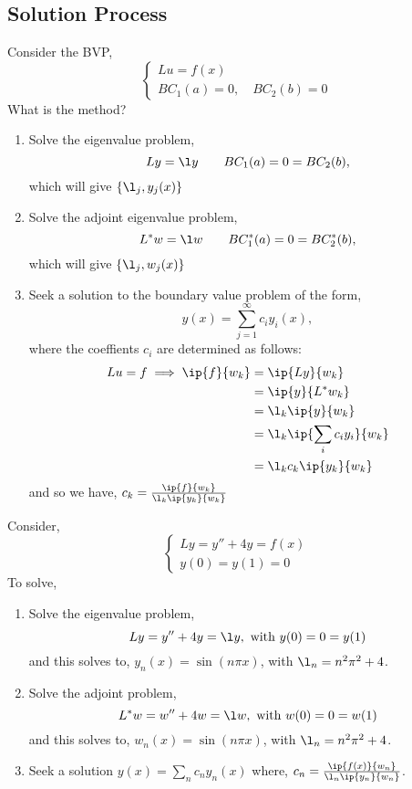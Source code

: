 \subsection{Solution Process}
Consider the BVP,
$$ \begin{cases}
  Lu = f(x) \\
  BC_1(a) = 0, \quad BC_2(b) = 0
\end{cases} $$
What is the method?
\begin{enumerate}
  \item Solve the eigenvalue problem,
  $$ Ly = \l y \qquad BC_1(a) = 0 = BC_2(b), $$
  which will give $\{\l_j, y_j(x)\}$
  \item Solve the adjoint eigenvalue problem,
  $$ L^*w = \l w \qquad BC_1^*(a) = 0 = BC_2^*(b),$$
  which will give $\{\l_j, w_j(x)\}$
  \item Seek a solution to the boundary value problem of the form,
  $$ y(x) = \sum_{j=1}^\infty c_iy_i(x), $$
  where the coeffients $c_i$ are determined as follows:
  \begin{align*}
    Lu = f \implies \ip{f}{w_k} &= \ip{Ly}{w_k}\\
     &=\ip{y}{L^*w_k}\\
     &=\l_k\ip{y}{w_k} \\
     &=\l_k \ip{ \sum_i c_iy_i}{w_k}  \\
     &=\l_k c_k \ip{y_k}{w_k} \\
  \end{align*}
  and so we have, $c_k = \frac{\ip{f}{w_k}}{\l_k \ip{y_k}{w_k}}$
\end{enumerate}


\begin{eg}
  Consider,
  $$ \begin{cases}
    Ly = y'' + 4y = f(x)\\
    y(0) = y(1) = 0
  \end{cases} $$
  To solve,
  \begin{enumerate}
    \item Solve the eigenvalue problem,
    $$ Ly = y'' + 4y = \l y, \text{ with } y(0) = 0 = y(1) $$
    and this solves to, $y_n(x) = \sin (n\pi x)$, with $\l_n = n^2\pi^2 + 4$.
    \item Solve the adjoint problem,
    $$ L^*w = w'' + 4w = \l w, \text{ with } w(0) = 0 = w(1)$$
    and this solves to, $w_n(x) = \sin (n\pi x)$, with $\l_n = n^2\pi^2 + 4$.
    \item Seek a solution $y(x) = \sum_n c_ny_n(x)$ where, $c_n = \frac{\ip{f(x)}{w_n}}{\l_n\ip{y_n}{w_n}}$.
  \end{enumerate}
\end{eg}


